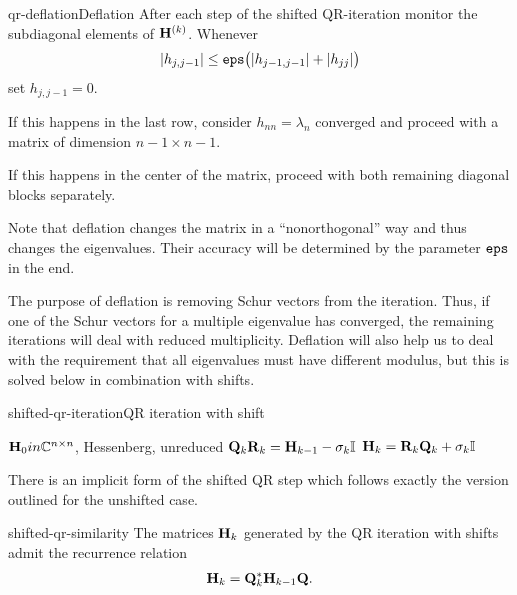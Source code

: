 \begin{Algorithm*}{qr-deflation}{Deflation}
  After each step of the shifted QR-iteration monitor the subdiagonal
  elements of $\mathbf H^{(k)}$. Whenever
  \begin{gather}
    \lvert h_{j,j-1}\rvert \le \texttt{eps} \bigl(\lvert h_{j-1,j-1}\rvert+\lvert h_{jj}\rvert\bigr)
  \end{gather}
  set $h_{j,j-1}=0$.

  If this happens in the last row, consider $h_{nn}=\lambda_n$
  converged and proceed with a matrix of dimension $n-1\times n-1$.

  If this happens in the center of the matrix, proceed with both
  remaining diagonal blocks separately.

  Note that deflation changes the matrix in a ``nonorthogonal'' way
  and thus changes the eigenvalues. Their accuracy will be determined
  by the parameter $\texttt{eps}$ in the end.
\end{Algorithm*}

\begin{remark}
  The purpose of deflation is removing Schur vectors from the
  iteration. Thus, if one of the Schur vectors for a multiple
  eigenvalue has converged, the remaining iterations will deal with
  reduced multiplicity. Deflation will also help us to deal with the
  requirement that all eigenvalues must have different modulus, but
  this is solved below in combination with shifts.
\end{remark}

\begin{Algorithm*}{shifted-qr-iteration}{QR iteration with shift}
  \begin{algorithmic}[1]
    \Require $\mathbf H_0 in\mathbb C^{n\times n}$, Hessenberg, unreduced
    \State $\mathbf Q_k\mathbf R_k = \mathbf H_{k-1} - \sigma_k\mathbb I$
    \State $\mathbf H_{k} = \mathbf R_k\mathbf Q_k + \sigma_k\mathbb I$
    \EndFor
  \end{algorithmic}
  There is an implicit form of the shifted QR step which follows
  exactly the version outlined for the unshifted case.
\end{Algorithm*}

\begin{Lemma}{shifted-qr-similarity}
  The matrices $\mathbf H_k$ generated by the QR iteration with shifts
  admit the recurrence relation
  \begin{gather}
    \mathbf H_k = \mathbf Q_k^*\mathbf H_{k-1}\mathbf Q.
  \end{gather}
\end{Lemma}  

